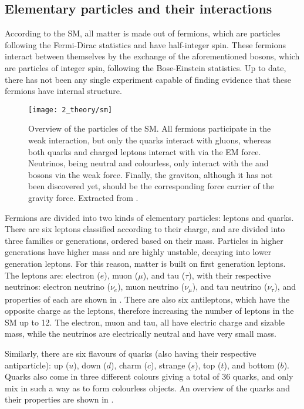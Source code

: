 \subsection{Elementary particles and their interactions}
\label{subsec:theory:sm:particles_interaction}

According to the \ac{SM}, all matter is made out of fermions, which are particles following the Fermi-Dirac statistics and have half-integer spin. These fermions interact between themselves by the exchange of the aforementioned bosons, which are particles of integer spin, following the Bose-Einstein statistics. Up to date, there has not been any single experiment capable of finding evidence that these fermions have internal structure.

\begin{figure}[ht!]
    \centering
    \texttt{[image: 2\_theory/sm]}
    \caption{Overview of the particles of the \ac{SM}. All fermions participate in the weak interaction, but only the quarks interact with gluons, whereas both quarks and charged leptons interact with via the \ac{EM} force. Neutrinos, being neutral and colourless, only interact with the \Wboson and \Zboson bosons via the weak force. Finally, the graviton, although it has not been discovered yet, should be the corresponding force carrier of the gravity force. Extracted from .}
    \label{fig:theory:sm:particles_interaction:particles}
\end{figure}

Fermions are divided into two kinds of elementary particles: leptons and quarks. There are six leptons classified according to their charge, and are divided into three families or generations, ordered based on their mass. Particles in higher generations have higher mass and are highly unstable, decaying into lower generation leptons. For this reason, matter is built on first generation leptons. The leptons are: electron (\(e\)), muon (\(\mu\)), and tau (\(\tau\)), with their respective neutrinos: electron neutrino (\(\nu_{e}\)), muon neutrino (\(\nu_{\mu}\)), and tau neutrino (\(\nu_{\tau}\)), and properties of each are shown in \Fig{\ref{fig:theory:sm:particles_interaction:particles}}.
There are also six antileptons, which have the opposite charge as the leptons, therefore increasing the number of leptons in the \ac{SM} up to 12. The electron, muon and tau, all have electric charge and sizable mass, while the neutrinos are electrically neutral and have very small mass.

Similarly, there are six flavours of quarks (also having their respective antiparticle): up (\(u\)), down (\(d\)), charm (\(c\)), strange (\(s\)), top (\(t\)), and bottom (\(b\)). Quarks also come in three different colours giving a total of 36 quarks, and only mix in such a way as to form colourless objects. An overview of the quarks and their properties are shown in \Fig{\ref{fig:theory:sm:particles_interaction:particles}}.


